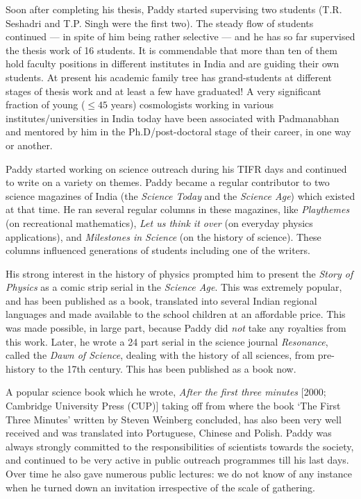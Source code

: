 \documentclass[prd, preprint, longbibliography, 12pt]{revtex4-2}
\begin{document}
Soon after completing his thesis, Paddy started supervising two
students (T.R. Seshadri and T.P. Singh were the first two). The steady
flow of students continued --- in spite of him being rather selective
--- and he has so far supervised the thesis work of 16 students.
It is commendable that more than ten  of them hold faculty positions
in different institutes in India  and are guiding their own students.
At present his academic family tree has grand-students at different
stages of thesis work and at least a few have graduated!
A very significant fraction of young ($\leq 45$ years)
cosmologists working in various institutes/universities in India today
have been associated with Padmanabhan and mentored by him in the
Ph.D/post-doctoral stage of their career, in one way or another. 

Paddy started working on science outreach during his TIFR days and
continued to write on a variety on themes.
Paddy became a regular contributor to two science magazines of India
(the \textit{Science Today} and the \textit{Science Age}) which
existed at that time. He ran several regular columns in these
magazines, like \textit{Playthemes} (on recreational mathematics),
\textit{Let us think it over} (on everyday physics applications), and
\textit{Milestones in Science} (on the history of science). These
columns influenced generations of students including one of the
writers. 

His strong interest in the history of physics prompted him to present
the \textit{Story of Physics} as a comic strip serial in the
\textit{Science Age}.
This was extremely popular, and has been published as a book, translated
into several Indian regional languages and made available to the
school children at an affordable price.
This was made possible, in large part,  because Paddy did
\textit{not} take any royalties from this work.
Later, he wrote a 24 part serial in the science journal
\textit{Resonance}, called the \textit{Dawn of Science}, dealing with
the history of all sciences, from pre-history to the 17th
century. This has been published as a book now. 

 A popular science book which he wrote, \textit{After the first three
   minutes} [2000; Cambridge University Press (CUP)] taking off from
 where the book `The First Three Minutes' written by Steven Weinberg
 concluded, has also been very well received and was translated into
 Portuguese, Chinese and Polish. Paddy was always strongly committed
 to the responsibilities of scientists towards the society, and
 continued to be very active in public outreach programmes till his
 last days. 
Over time he also gave
numerous public lectures: we do not know of any instance when he
turned down an invitation irrespective of the scale of gathering.  
\end{document}
